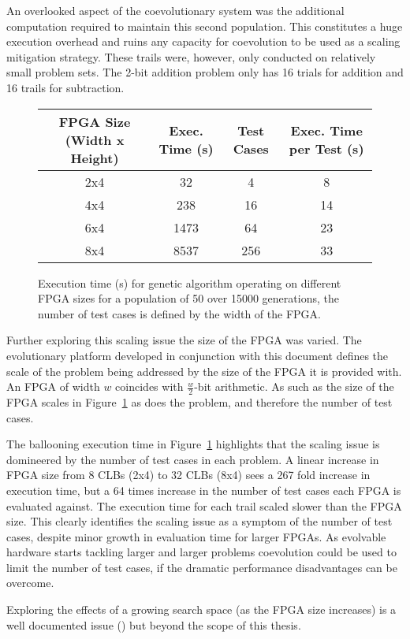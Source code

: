 An overlooked aspect of the coevolutionary system was the additional computation
required to maintain this second population. This constitutes a huge execution
overhead and ruins any capacity for coevolution to be used as a scaling mitigation
strategy. These trails were, however, only conducted on relatively small problem
sets. The 2-bit addition problem only has 16 trials for addition and 16 trails
for subtraction.

\begin{figure}
	\centering
\begin{tabular}{cccc}
	\toprule
	\bfseries{FPGA Size (Width x Height)} & \bfseries{Exec. Time (s)} & \bfseries{Test Cases}
	& \bfseries{Exec. Time per Test (s)} \\
	\midrule
	2x4 & 32 & 4 & 8\\
	4x4 & 238 & 16 & 14\\
	6x4 & 1473 & 64 & 23\\
	8x4 & 8537 & 256 & 33\\
	\bottomrule
\end{tabular}
\caption[Execution time for genetic algorithm operating on different FPGA sizes]
{Execution time (s) for genetic algorithm operating on different FPGA sizes for
a population of 50 over 15000 generations, the number of test cases is defined
by the width of the FPGA.}
\label{fig:size}
\end{figure}

Further exploring this scaling issue the size of the FPGA was varied.
The evolutionary platform developed in conjunction with this document
defines the scale of the problem being addressed by the size of the FPGA
it is provided with. An FPGA of width $w$ coincides with $\frac{w}{2}$-bit arithmetic.
As such as the size of the FPGA scales in Figure~\ref{fig:size} as does
the problem, and therefore the number of test cases.

The ballooning execution time in Figure~\ref{fig:size} highlights that the
scaling issue is domineered by the number of test cases in each problem. A linear increase in FPGA
size from 8 CLBs (2x4) to 32 CLBs (8x4) sees a 267 fold increase in execution
time, but a 64 times increase in the number of test cases each FPGA is evaluated
against. The execution time for each trail scaled slower than the FPGA size.
This clearly identifies the scaling issue as a symptom of the number
of test cases, despite minor growth in evaluation time for larger FPGAs.
As evolvable hardware starts tackling larger and larger
problems coevolution could be used to limit the number of test cases, if the
dramatic performance disadvantages can be overcome.

Exploring the effects of a growing search space (as the FPGA size increases)
is a well documented issue
(\cite{10.1007/978-3-540-46239-2_5}\cite{Torresen2002}\cite{1508485})
but beyond the scope of this thesis.
